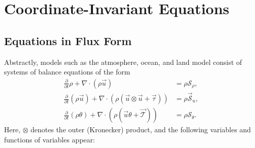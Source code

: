 \documentclass{report}
\begin{document}
\section{Coordinate-Invariant Equations}

\subsection{Equations in Flux Form}

Abstractly, models such as the atmosphere, ocean, and land model consist of systems of balance equations of the form 
\begin{subequations}\label{e:balance_equations}
\begin{align}
     \frac{\partial}{\partial t} \rho + \nabla \cdot \left( \rho \vec{u} \right)
    & = \rho \mathcal{S}_\rho, \label{e:continuity}\\
   \frac{\partial}{\partial t} (\rho \vec{u})
    + \nabla \cdot \left( \rho (\vec{u} \otimes \vec{u} + \vec{\tau}) \right)
    & = \rho \vec{\mathcal{S}}_u,\\
     \frac{\partial}{\partial t} (\rho \theta) + \nabla \cdot \left(\rho (\vec{u}\theta + \vec{\mathcal{T}}) \right)
    & = \rho \mathcal{S}_\theta.
\end{align}
\end{subequations}
Here, $\otimes$ denotes the outer (Kronecker) product, and the following variables and functions of variables appear:
\end{document}
